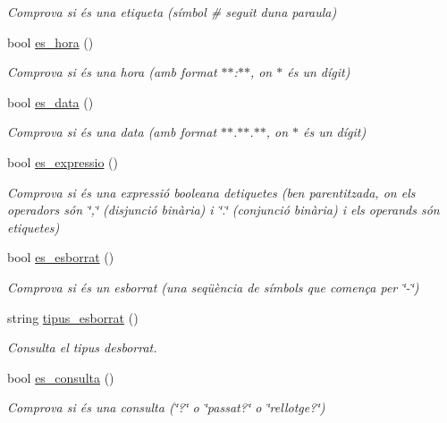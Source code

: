 \begin{DoxyCompactItemize}
\begin{DoxyCompactList}\small\item\em Comprova si és una etiqueta (símbol \# seguit d\textquotesingle{}una paraula) \end{DoxyCompactList}\item 
bool \hyperlink{class_token_a16aead065c986f34b51c6193bd42882c}{es\+\_\+hora} ()
\begin{DoxyCompactList}\small\item\em Comprova si és una hora (amb format $\ast$$\ast$\+:$\ast$$\ast$, on $\ast$ és un dígit) \end{DoxyCompactList}\item 
bool \hyperlink{class_token_a8791d9d6123190213f63ad1026ca05be}{es\+\_\+data} ()
\begin{DoxyCompactList}\small\item\em Comprova si és una data (amb format $\ast$$\ast$.$\ast$$\ast$.$\ast$$\ast$, on $\ast$ és un dígit) \end{DoxyCompactList}\item 
bool \hyperlink{class_token_a09eb1782d5b5d9d4a2a92f33c950bfc1}{es\+\_\+expressio} ()
\begin{DoxyCompactList}\small\item\em Comprova si és una expressió booleana d\textquotesingle{}etiquetes (ben parentitzada, on els operadors són \char`\"{},\char`\"{} (disjunció binària) i \char`\"{}.\char`\"{} (conjunció binària) i els operands són etiquetes) \end{DoxyCompactList}\item 
bool \hyperlink{class_token_ab49eee0e53697bbbbbcbf0c105b3cf77}{es\+\_\+esborrat} ()
\begin{DoxyCompactList}\small\item\em Comprova si és un esborrat (una seqüència de símbols que comença per \char`\"{}-\/\char`\"{}) \end{DoxyCompactList}\item 
string \hyperlink{class_token_a12c961c772aa760b719dc3becb523ac4}{tipus\+\_\+esborrat} ()
\begin{DoxyCompactList}\small\item\em Consulta el tipus d\textquotesingle{}esborrat. \end{DoxyCompactList}\item 
bool \hyperlink{class_token_a81c4eba71c6257da6cadfab43cb237da}{es\+\_\+consulta} ()
\begin{DoxyCompactList}\small\item\em Comprova si és una consulta (\char`\"{}?\char`\"{} o \char`\"{}passat?\char`\"{} o \char`\"{}rellotge?\char`\"{}) \end{DoxyCompactList}\end{DoxyCompactItemize}


